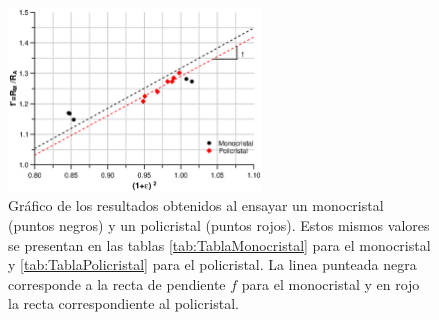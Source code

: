 \documentclass[a4paper,12pt,fleqn,twoside,openany]{book}
\begin{document}
 \begin{figure}[h]
 \centering
 \includegraphics[width=0.6\textwidth]{Img/Resultados/Resistencia/PoliMono2.eps}
 \caption{Gráfico de los resultados obtenidos al ensayar un monocristal (puntos negros) y un policristal (puntos rojos). Estos mismos valores se presentan en las tablas \ref{tab:TablaMonocristal} para el monocristal y \ref{tab:TablaPolicristal} para el policristal. La linea punteada negra corresponde a la recta de pendiente $f$ para el monocristal y en rojo la recta correspondiente al policristal.} 
 \label{fig:PoliMono}
 \end{figure}

%     
\end{document}
